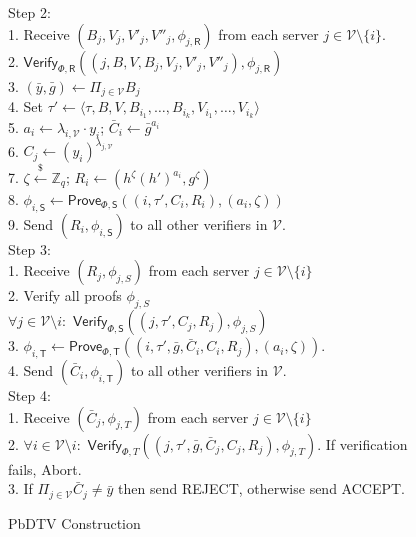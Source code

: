 \documentclass[conference]{IEEEtran}
\newcommand{\cR}{\mathsf{R}}
\newcommand{\cS}{\mathsf{S}}
\newcommand{\cV}{\mathcal{V}}
\newcommand{\cT}{\mathsf{T}}
\begin{document}
\begin{figure}
\begin{multicols}{2}
\noindent Step 2:\\
        1. Receive $(B_j,V_j,V'_j,V''_j,\phi_{j,\cR})$ from each server $j \in \cV \setminus \{i\}$.\\
        2. $\mathsf{Verify}_{\Phi,\cR}((j,B,V,B_j,V_j,V'_j,V''_j), \phi_{j,\cR})$\\ 
        3. $(\bar{y},\bar{g}) \leftarrow \Pi_{j \in \cV} B_j$\\
        4. Set $\tau' \leftarrow \langle \tau,B,V,B_{i_1},\ldots,B_{i_k},V_{i_1},\ldots,V_{i_k} \rangle$\\
        5. $a_i \leftarrow \lambda_{i,\cV} \cdot y_i$; $\bar{C}_i \leftarrow \bar{g}^{a_i}$\\
        6. $C_j \leftarrow (y_i)^{\lambda_{j,\cV}}$\\
        7. $\zeta \xleftarrow{\$} \mathbb{Z}_q$; $R_i \leftarrow (h^{\zeta}(h')^{a_i},g^{\zeta})$\\
        8. $\phi_{i,\cS} \leftarrow \mathsf{Prove}_{\Phi,\cS}((i,\tau',C_i,R_i),(a_i,\zeta))$\\
        9. Send $(R_i,\phi_{i,\cS})$ to all other verifiers in $\mathcal{V}$.\\

\noindent Step 3:\\
        1. Receive $(R_j,\phi_{j,S})$ from each server $j \in \cV \setminus \{i\}$\\
        2. Verify all proofs $\phi_{j,S}$\\ 
        $\forall j \in \cV \setminus i:$ $\mathsf{Verify}_{\Phi,\cS} ((j,\tau',C_j,R_j),\phi_{j,S})$\\
        3. $\phi_{i,\cT} \leftarrow \mathsf{Prove}_{\Phi,\cT}((i,\tau',\bar{g},\bar{C}_i, C_i,R_j),(a_i, \zeta))$.\\
        4. Send $(\bar{C}_i,\phi_{i,\cT})$ to all other verifiers in $\mathcal{V}$.\\

\noindent Step 4:\\
        1. Receive $(\bar{C}_j, \phi_{j,T})$ from each server $j \in \cV \setminus \{i\}$\\
        2. $\forall i \in \cV \setminus i:$ $\mathsf{Verify}_{\Phi,T}((j,\tau',\bar{g},\bar{C}_j,C_j,R_j), \phi_{j,T})$. If verification fails, Abort.\\
        3. If $\Pi_{j \in \cV} \bar{C}_{j} \neq \bar{y}$ then send REJECT, otherwise send ACCEPT.\\

\end{multicols}
\caption{PbDTV Construction}
\label{PbDTV-Construction}
\end{figure}
\end{document}
